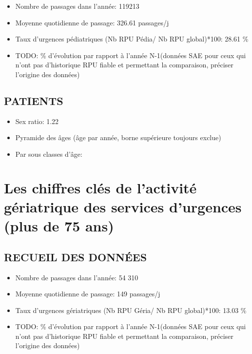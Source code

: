 \documentclass[]{article}
\begin{document}
\begin{itemize}
\itemsep1pt\parskip0pt
\item
  Nombre de passages dans l'année: 119213
\item
  Moyenne quotidienne de passage: 326.61 passages/j
\item
  Taux d'urgences pédiatriques (Nb RPU Pédia/ Nb RPU global)*100: 28.61
  \%
\item
  TODO: \% d'évolution par rapport à l'année N-1(données SAE pour ceux
  qui n'ont pas d'historique RPU fiable et permettant la comparaison,
  préciser l'origine des données)
\end{itemize}

\subsection{PATIENTS}\label{patients-1}

\begin{itemize}
\itemsep1pt\parskip0pt
\item
  Sex ratio: 1.22
\item
  Pyramide des âges (âge par année, borne supérieure toujours exclue)
\item
  Par sous classes d'âge:
\end{itemize}

\section{Les chiffres clés de l'activité gériatrique des services
d'urgences (plus de 75
ans)}\label{les-chiffres-cles-de-lactivite-geriatrique-des-services-durgences-plus-de-75-ans}

\subsection{RECUEIL DES DONNÉES}\label{recueil-des-donnees-2}

\begin{itemize}
\itemsep1pt\parskip0pt
\item
  Nombre de passages dans l'année: 54 310
\item
  Moyenne quotidienne de passage: 149 passages/j
\item
  Taux d'urgences gériatriques (Nb RPU Géria/ Nb RPU global)*100: 13.03
  \%
\item
  TODO: \% d'évolution par rapport à l'année N-1(données SAE pour ceux
  qui n'ont pas d'historique RPU fiable et permettant la comparaison,
  préciser l'origine des données)
\end{itemize}
\end{document}
